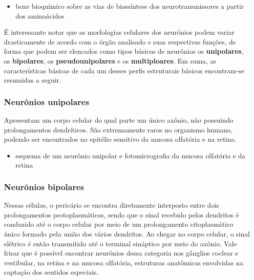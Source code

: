 \documentclass[
]{book}
\providecommand{\tightlist}{%
  \setlength{\itemsep}{0pt}\setlength{\parskip}{0pt}}
\theoremstyle{definition}
\theoremstyle{definition}
\theoremstyle{definition}
\theoremstyle{definition}
\theoremstyle{remark}
\begin{document}
\begin{itemize}
\tightlist
\item
  boxe bioquímico sobre as vias de biossíntese dos neurotransmissores a partir dos aminoácidos
\end{itemize}

É interessante notar que as morfologias celulares dos neurônios podem variar drasticamente de acordo com o órgão analisado e suas respectivas funções, de forma que podem ser elencados como tipos básicos de neurônios os \textbf{unipolares}, os \textbf{bipolares}, os \textbf{pseudounipolares} e os \textbf{multiploares}. Em suma, as características básicas de cada um desses perfis estruturais básicos encontram-se resumidas a seguir.

\hypertarget{neuruxf4nios-unipolares}{%
\subsubsection*{Neurônios unipolares}\label{neuruxf4nios-unipolares}}

Apresentam um corpo celular do qual parte um único axônio, não possuindo prolongamentos dendríticos. São extremamente raros no organismo humano, podendo ser encontrados no epitélio sensitivo da mucosa olfatória e na retina.

\begin{itemize}
\tightlist
\item
  esquema de um neurônio unipolar e fotomicrografia da mucosa olfatória e da retina
\end{itemize}

\hypertarget{neuruxf4nios-bipolares}{%
\subsubsection*{Neurônios bipolares}\label{neuruxf4nios-bipolares}}

Nessas células, o pericário se encontra diretamente interposto entre dois prolongamentos protoplasmáticos, sendo que o sinal recebido pelos dendritos é conduzido até o corpo celular por meio de um prolongamento citoplasmático único formado pela união dos vários dendritos. Ao chegar no corpo celular, o sinal elétrico é então transmitido até o terminal sináptico por meio do axônio. Vale frisar que é possível encontrar neurônios dessa categoria nos gânglios coclear e vestibular, na retina e na mucosa olfatória, estruturas anatômicas envolvidas na captação dos sentidos especiais.
\end{document}
